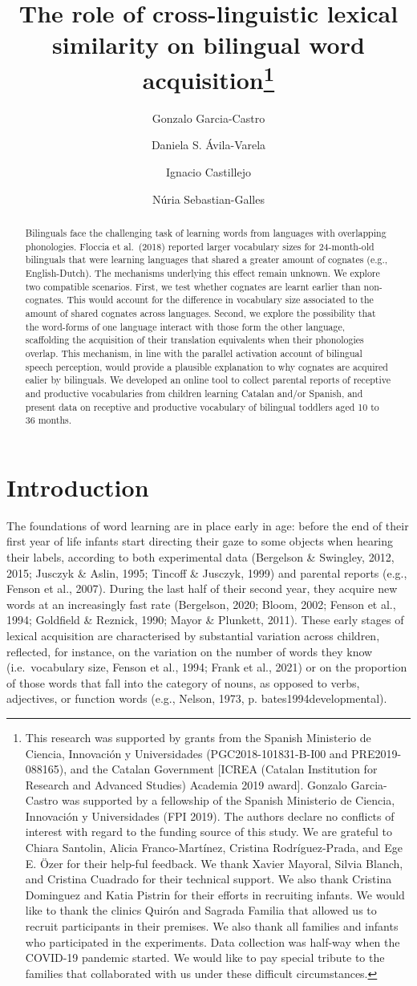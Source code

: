 \documentclass[
  letterpaper,
  DIV=11,
  numbers=noendperiod]{scrartcl}
\title{The role of cross-linguistic lexical similarity on bilingual word
acquisition\thanks{This research was supported by grants from the
Spanish Ministerio de Ciencia, Innovación y Universidades
(PGC2018-101831-B-I00 and PRE2019-088165), and the Catalan Government
{[}ICREA (Catalan Institution for Research and Advanced Studies)
Academia 2019 award{]}. Gonzalo Garcia-Castro was supported by a
fellowship of the Spanish Ministerio de Ciencia, Innovación y
Universidades (FPI 2019). The authors declare no conflicts of interest
with regard to the funding source of this study. We are grateful to
Chiara Santolin, Alicia Franco-Martínez, Cristina Rodríguez-Prada, and
Ege E. Özer for their help-ful feedback. We thank Xavier Mayoral, Silvia
Blanch, and Cristina Cuadrado for their technical support. We also thank
Cristina Dominguez and Katia Pistrin for their efforts in recruiting
infants. We would like to thank the clinics Quirón and Sagrada Familia
that allowed us to recruit participants in their premises. We also thank
all families and infants who participated in the experiments. Data
collection was half-way when the COVID-19 pandemic started. We would
like to pay special tribute to the families that collaborated with us
under these difficult circumstances.}}
\author{Gonzalo Garcia-Castro \and Daniela S. Ávila-Varela \and Ignacio
Castillejo \and Núria Sebastian-Galles}
\date{}
\begin{document}
\maketitle
\begin{abstract}
Bilinguals face the challenging task of learning words from languages
with overlapping phonologies. Floccia et al.~(2018) reported larger
vocabulary sizes for 24-month-old bilinguals that were learning
languages that shared a greater amount of cognates (e.g.,
English-Dutch). The mechanisms underlying this effect remain unknown. We
explore two compatible scenarios. First, we test whether cognates are
learnt earlier than non-cognates. This would account for the difference
in vocabulary size associated to the amount of shared cognates across
languages. Second, we explore the possibility that the word-forms of one
language interact with those form the other language, scaffolding the
acquisition of their translation equivalents when their phonologies
overlap. This mechanism, in line with the parallel activation account of
bilingual speech perception, would provide a plausible explanation to
why cognates are acquired ealier by bilinguals. We developed an online
tool to collect parental reports of receptive and productive
vocabularies from children learning Catalan and/or Spanish, and present
data on receptive and productive vocabulary of bilingual toddlers aged
10 to 36 months.
\end{abstract}
\ifdefined\Shaded\renewenvironment{Shaded}{\begin{tcolorbox}[boxrule=0pt, frame hidden, sharp corners, borderline west={3pt}{0pt}{shadecolor}, enhanced, interior hidden, breakable]}{\end{tcolorbox}}\fi

\hypertarget{introduction}{%
\section{Introduction}\label{introduction}}

The foundations of word learning are in place early in age: before the
end of their first year of life infants start directing their gaze to
some objects when hearing their labels, according to both experimental
data (Bergelson \& Swingley, 2012, 2015; Jusczyk \& Aslin, 1995; Tincoff
\& Jusczyk, 1999) and parental reports (e.g., Fenson et al., 2007).
During the last half of their second year, they acquire new words at an
increasingly fast rate (Bergelson, 2020; Bloom, 2002; Fenson et al.,
1994; Goldfield \& Reznick, 1990; Mayor \& Plunkett, 2011). These early
stages of lexical acquisition are characterised by substantial variation
across children, reflected, for instance, on the variation on the number
of words they know (i.e.~vocabulary size, Fenson et al., 1994; Frank et
al., 2021) or on the proportion of those words that fall into the
category of nouns, as opposed to verbs, adjectives, or function words
(e.g., Nelson, 1973, p. bates1994developmental).
\end{document}
